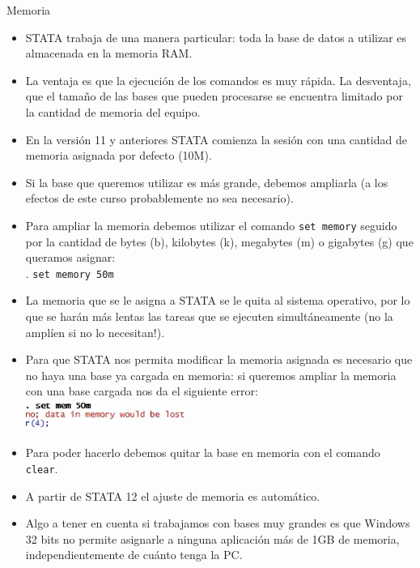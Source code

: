 \documentclass{beamer}
\begin{document}
\begin{frame}[allowframebreaks]{Memoria}
\begin{itemize}
\item STATA trabaja de una manera particular: toda la base de datos a utilizar es almacenada en la memoria RAM.
\item La ventaja es que la ejecución de los comandos es muy rápida. La desventaja, que el tamaño de las bases que pueden procesarse se encuentra limitado por la cantidad de memoria del equipo.
\item En la versión 11 y anteriores STATA comienza la sesión con una cantidad de memoria asignada por defecto (10M). 
\item Si la base que queremos utilizar es más grande, debemos ampliarla (a los efectos de este curso probablemente no sea necesario). 
\item Para ampliar la memoria debemos utilizar el comando \texttt{set memory} seguido por la cantidad de bytes (b), kilobytes (k), megabytes (m) o gigabytes (g) que queramos asignar: \\
. \texttt{set memory 50m}
\item La memoria que se le asigna a STATA se le quita al sistema operativo, por lo que se harán más lentas las tareas que se ejecuten simultáneamente (no la amplíen si no lo necesitan!).
\item Para que STATA nos permita modificar la memoria asignada es necesario que no haya una base ya cargada en memoria: si queremos ampliar la memoria con una base cargada nos da el siguiente error:\\\smallskip
\includegraphics[height=1cm]{mem.jpg}
\item Para poder hacerlo debemos quitar la base en memoria con el comando \texttt{clear}.
\item A partir de STATA 12 el ajuste de memoria es automático.
\item Algo a tener en cuenta si trabajamos con bases muy grandes es que Windows 32 bits no permite asignarle a ninguna aplicación más de 1GB de memoria, independientemente de cuánto tenga la PC.
\end{itemize}
\end{frame}
\end{document}
